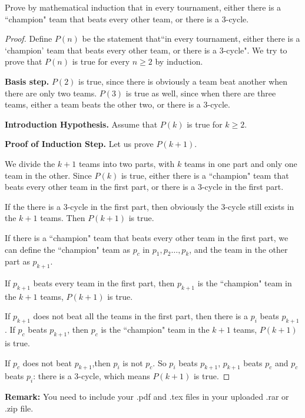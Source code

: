 \documentclass[12pt,a4paper]{article}
\theoremstyle{definition}
\begin{document}
\begin{enumerate}
Prove by mathematical induction that in every tournament, either there is a ``champion" team that beats every other team, or there is a 3-cycle. 
    \begin{proof}
        Define $P(n)$ be the statement that``in every tournament, either there is a `champion' team that beats every other team, or there is a 3-cycle". We try to prove that $P(n)$ is true for every $n \geqslant 2$ by induction.
        
        \textbf{Basis step.} $P(2)$ is true, since there is obviously a team beat another when there are only two teams. $P(3)$ is true as well, since when there are three teams, either a team beats the other two, or there is a 3-cycle.
        
        \textbf{Introduction Hypothesis.} Assume that $P(k)$ is true for $k \geqslant 2$.
        
        \textbf{Proof of Induction Step.} Let us prove $P(k+1)$.
        
        We divide the $k+1$ teams into two parts, with $k$ teams in one part and only one team in the other. Since $P(k)$ is true, either there is a ``champion" team that beats every other team in the first part, or there is a 3-cycle in the first part. 
        
        If the there is a 3-cycle in the first part, then obviously the 3-cycle still exists in the $k+1$ teams. Then $P(k+1)$ is true.
        
        If  there is a ``champion" team that beats every other team in the first part, we can define the ``champion" team as $p_{c}$ in $p_{1},p_{2}\ldots,p_{k}$, and the team in the other part as $p_{k+1}$. 
        
        If $p_{k+1}$ beats every team in the first part, then $p_{k+1}$ is the ``champion" team in the $k+1$ teams, $P(k+1)$ is true. 
        
        If $p_{k+1}$ does not beat all the teams in the first part, then there is a $p_i$ beats $p_{k+1}$. If $p_c$ beats $p_{k+1}$, then $p_c$ is the ``champion" team in the $k+1$ teams, $P(k+1)$ is true. 
        
        If $p_c$ does not beat $p_{k+1}$,then $p_i$ is not $p_c$. So $p_i$ beats $p_{k+1}$, $p_{k+1}$ beats $p_{c}$ and $p_c$ beats $p_i$: there is a 3-cycle, which means $P(k+1)$ is true.
        
    \end{proof}

\end{enumerate}

\vspace{20pt}

\textbf{Remark:} You need to include your .pdf and .tex files in your uploaded .rar or .zip file.

\end{document}
